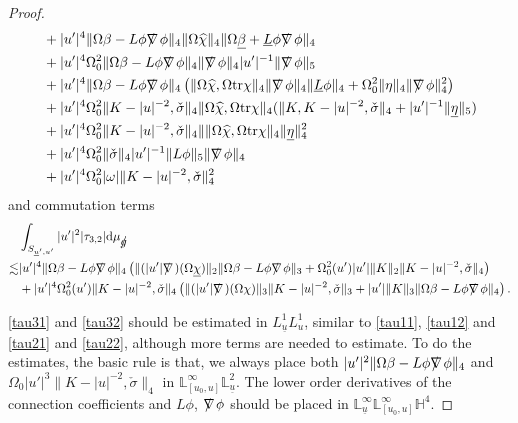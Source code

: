\documentclass[11pt,reqno]{amsart}
\theoremstyle{definition}
\numberwithin{equation}{section}
\newcommand{\D}{\mathrm{d}}
\newcommand{\tr}{\mathrm{tr}}
\renewcommand{\L}{\mathbb{L}}
\renewcommand{\H}{\mathbb{H}}
\def\betab{\underline{\beta}}
\def\chib{\underline{\chi}}
\def\chih{\widehat{\chi}}
\def\etab{\underline{\eta}}
\def\Lb{\underline{L}}
\def\tr{\mathrm{tr}}
\def\sigmac{\check{\sigma}}
\def\ub{\underline{u}}
\def\nablas{\mbox{$\nabla \mkern -13mu /$ }}
\def\gs{\mbox{$g \mkern -9mu /$}}
\begin{document}
\begin{proof}
\begin{equation}
\begin{split}
&+|u'|^4\|\Omega\beta-L\phi\nablas\phi\|_4\|\Omega\chih\|_4\|\Omega\betab+\Lb\phi\nablas\phi\|_4\\
&+|u'|^4\Omega_0^2\|\Omega\beta-L\phi\nablas\phi\|_4\|\nablas\phi\|_4|u'|^{-1}\|\nablas\phi\|_5\\
&+|u'|^4\|\Omega\beta-L\phi\nablas\phi\|_4\left(\|\Omega\chih,\Omega\tr\chi\|_4\|\nablas\phi\|_4\|\Lb\phi\|_4+\Omega_0^2\|\eta\|_4\|\nablas\phi\|_4^2\right)\\
&+|u'|^4\Omega_0^2\|K-|u|^{-2},\sigmac\|_4\|\Omega\chih, \Omega\tr\chi\|_4(\|K,K-|u|^{-2},\sigmac\|_4+|u'|^{-1}\|\etab\|_5)\\
&+|u'|^4\Omega_0^2\|K-|u|^{-2},\sigmac\|_4\|\|\Omega\chih,\Omega\tr\chi\|_4\|\etab\|_4^2\\
&+|u'|^4\Omega_0^2\|\sigmac\|_4|u'|^{-1}\|L\phi\|_5\|\nablas\phi\|_4\\
&+|u'|^4\Omega_0^2|\omega|\|K-|u|^{-2},\sigmac\|_4^2
\end{split}
\end{equation}
and commutation terms
\begin{equation}\label{tau32}
\begin{split}
&\int_{S_{\ub',u'}}|u'|^2|\tau_{3,2}|\D\mu_{\gs}\\
\lesssim&|u'|^4\|\Omega\beta-L\phi\nablas\phi\|_4\left(\|(|u'|\nablas)(\Omega\chib)\|_2\|\Omega\beta-L\phi\nablas\phi\|_3+\Omega_0^2(u')|u'|\|K\|_2\|K-|u|^{-2},\sigmac\|_4\right)\\
&+|u'|^4\Omega_0^2(u')\|K-|u|^{-2},\sigmac\|_4\left(\|(|u'|\nablas)(\Omega\chi)\|_3\|K-|u|^{-2},\sigmac\|_3+|u'|\|K\|_3\|\Omega\beta-L\phi\nablas\phi\|_4\right).
\end{split}
\end{equation}

\eqref{tau31} and \eqref{tau32} should be estimated in $L_{\ub}^1L^1_u$, similar to \eqref{tau11}, \eqref{tau12} and \eqref{tau21} and \eqref{tau22}, although more terms are needed to estimate. To do the estimates, the basic rule is that, we always place both $|u'|^2\|\Omega\beta-L\phi\nablas\phi\|_4$ and $\Omega_0|u'|^3\|K-|u|^{-2},\check{\sigma}\|_4$ in $\L^\infty_{[u_0,u]}\L_{\ub}^2$. The lower order derivatives of the connection coefficients and $L\phi$, $\nablas\phi$ should be placed in $\L_{\ub}^\infty\L^\infty_{[u_0,u]}\H^4$. %


\end{proof}
\end{document}
